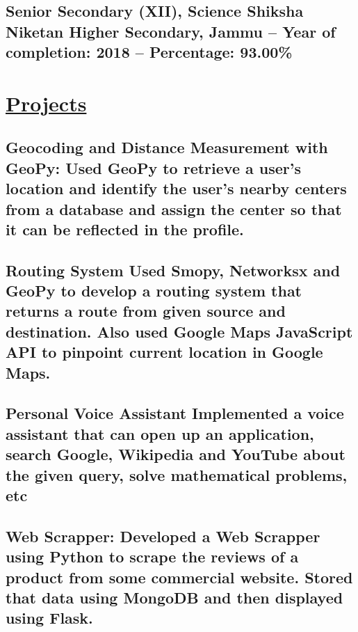 \documentclass{article}
\begin{document}
\subsection{\textbf{Senior Secondary (XII), Science}\newline
    \textmd{ Shiksha Niketan Higher Secondary, Jammu -- Year of completion: 2018 --  Percentage: 93.00\%}}


\section{\underline{Projects}}





\subsection{\textbf{Geocoding and Distance Measurement with GeoPy:}
    \textmd{Used GeoPy to retrieve a user's location and identify the user's nearby centers from a database and assign the center so that it can be reflected in the profile.}}

\subsection{\textbf{Routing System}
    \textmd{Used Smopy, Networksx and GeoPy to develop a routing system that returns a route from given source and destination. Also used Google Maps JavaScript API to pinpoint current location in Google Maps. }}

\subsection{\textbf{Personal Voice Assistant}
    \textmd{Implemented a voice assistant that can open up an application,
        search Google, Wikipedia and YouTube about the given query, solve mathematical problems, etc }}

\subsection{\textbf{Web Scrapper:}
    \textmd{Developed a Web Scrapper using Python to scrape the reviews of a product from some commercial website.
        Stored that data using MongoDB and then displayed using Flask.}}
\end{document}
